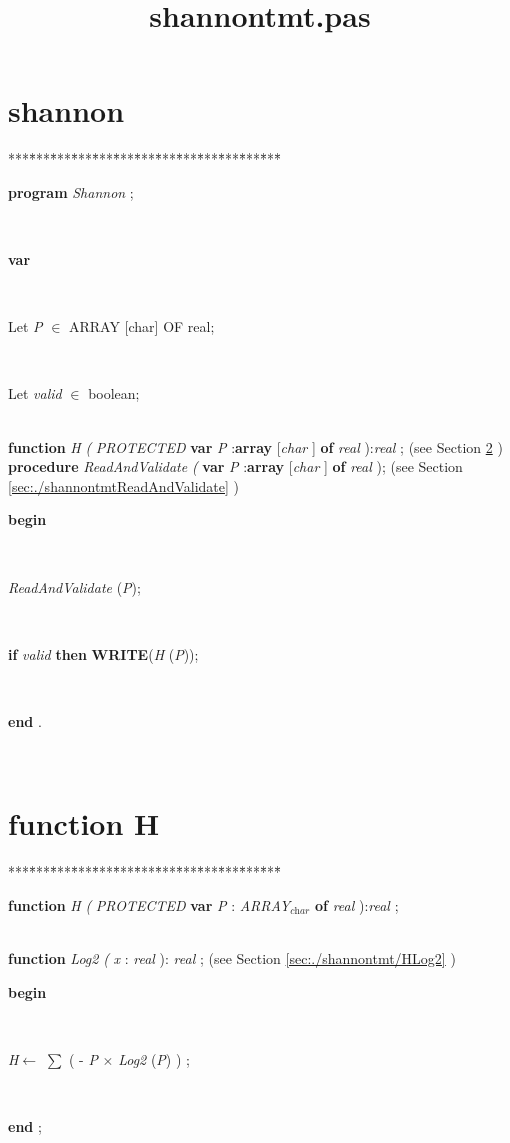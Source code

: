 \documentclass[10pt, a4paper]{article}
\title{shannontmt.pas}
\begin{document}
\maketitle

\tableofcontents
\section{shannon}
\begin{tabbing}
***\=***\=***\=***\=***\=***\=***\=***\=***\=***\=***\=***\=***\=\kill
\\
\parbox{14cm}{\textsf{\textbf{program}  \textit{Shannon} ;}}\\
\+\parbox{14cm}{\textsf{\textbf{var} }}\\
\parbox{14cm}{\textsf{Let \textit{P} $\in$ ARRAY [char] OF real;}}\\
\parbox{14cm}{\textsf{Let \textit{valid} $\in$ boolean;}}\\
\<\textsf{\textbf{function}  \textit{H} \textit{(} \textit{PROTECTED}  \textbf{var}  \textit{P} :\textbf{array} [\textit{char} ] \textbf{of}  \textit{real} ):\textit{real} ;} (see Section \ref{sec:./shannontmtH} )\\
\<\textsf{\textbf{procedure}  \textit{ReadAndValidate} \textit{(} \textbf{var}  \textit{P} :\textbf{array} [\textit{char} ] \textbf{of}  \textit{real} );} (see Section \ref{sec:./shannontmtReadAndValidate} )\\
\-\<\+\parbox{14cm}{\textsf{\textbf{begin} }}\\
\parbox{14cm}{\textsf{\textit{ReadAndValidate} (\textit{P})}; }\\
\parbox{14cm}{\textsf {\textbf {if } \textsf{\textit{valid}} \textbf{ then } \textsf{\textbf{WRITE}(\textit{H} (\textit{P}))}; }}\\
\<\-\parbox{14cm}{\textsf{\textbf{end} .}}\\
\end{tabbing}
\section{function H}\label{sec:./shannontmtH}

\begin{tabbing}
***\=***\=***\=***\=***\=***\=***\=***\=***\=***\=***\=***\=***\=\kill
\parbox{14cm}{\textsf {\textbf {function } \textsf{ \textit{H} \textit{(} \textit{PROTECTED}  } \textbf{ var } \textsf{\textit{P} : \textit{ARRAY}$_{\textit{char}}$} \textbf{ of } \textsf{ \textit{real} ):\textit{real} ;}}}\\
\+\textsf{\textbf{function}  \textit{Log2} \textit{(}  \textit{x} : \textit{real} ): \textit{real} ;} (see Section \ref{sec:./shannontmt/HLog2} )\\
\-\<\+\parbox{14cm}{\textsf{\textbf{begin} }}\\
\parbox{14cm}{\textsf{\textit{H}$\leftarrow$  $\sum$  ( -  \textit{P} $\times$ \textit{Log2} (\textit{P}) ) }; }\\
\<\-\parbox{14cm}{\textsf{\textbf{end}  ;}}\\
\end{tabbing}
\end{document}
